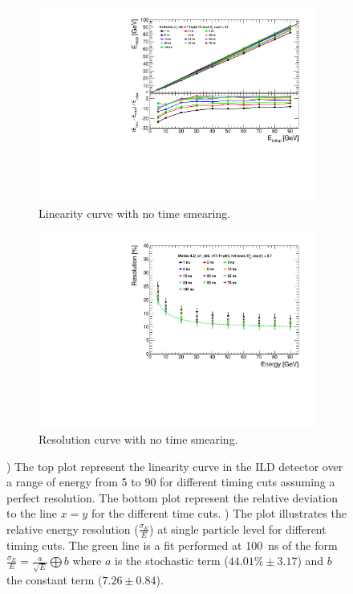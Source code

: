 \begin{figure}[htbp!]
  \centering
  \begin{subfigure}[t]{0.48\textwidth}
    \centering
    \includegraphics[width=1\linewidth]{chap6/fig_TimingILD/NoSmearing/Linearity_TimeCuts_noSmearing}
    \caption{Linearity curve with no time smearing.} \label{fig:linearityNoSmearing}
  \end{subfigure}
  \hfill
  \begin{subfigure}[t]{0.48\textwidth}
    \centering
    \includegraphics[width=1\linewidth]{chap6/fig_TimingILD/NoSmearing/ShowerResoAbsolute_TimeCuts_noSmearing}
    \caption{Resolution curve with no time smearing.} \label{fig:resoNoSmearing}
  \end{subfigure}
  \caption{) The top plot represent the linearity curve in the ILD detector over a range of energy from 5 \GeV to 90 \GeV for different timing cuts assuming a perfect resolution. The bottom plot represent the relative deviation to the line $x=y$ for the different time cuts. ) The plot illustrates the relative energy resolution ($\frac{\sigma_{E}}{E}$) at single particle level for different timing cuts. The green line is a fit performed at \SI{100}{\nano\second} of the form $\frac{\sigma_{E}}{E} = \frac{a}{\sqrt{E}} \bigoplus b$ where $a$ is the stochastic term ($44.01\% \pm 3.17$) and $b$ the constant term ($7.26 \pm 0.84$).}
\end{figure}

